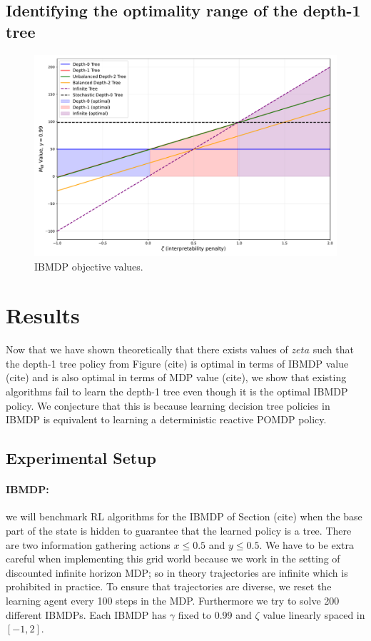 \subsection{Identifying the optimality range of the depth-1 tree}
\begin{figure}
    \centering
    \includegraphics[width=1\textwidth]{images/images_part1/objective_values_plot.pdf}
    \caption{IBMDP objective values.}\label{fig:objectives}
\end{figure}
\section{Results}
Now that we have shown theoretically that there exists values of $zeta$ such that the depth-1 tree policy from Figure (cite) is optimal in terms of IBMDP value (cite) and is also optimal in terms of MDP value (cite),
we show that existing algorithms fail to learn the depth-1 tree even though it is the optimal IBMDP policy.
We conjecture that this is because learning decision tree policies in IBMDP is equivalent to learning a deterministic reactive POMDP policy.

\subsection{Experimental Setup}
\paragraph{IBMDP:} we will benchmark RL algorithms for the IBMDP of Section (cite) when the base part of the state is hidden to guarantee that the learned policy is a tree.
There are two information gathering actions $x\leq0.5$ and $y\leq0.5$.
We have to be extra careful when implementing this grid world because we work in the setting of discounted infinite horizon MDP; so in theory trajectories are infinite which is prohibited in practice.
To ensure that trajectories are diverse, we reset the learning agent every 100 steps in the MDP.
Furthermore we try to solve 200 different IBMDPs. Each IBMDP has $\gamma$ fixed to 0.99 and $\zeta$ value linearly spaced in $[-1, 2]$.
